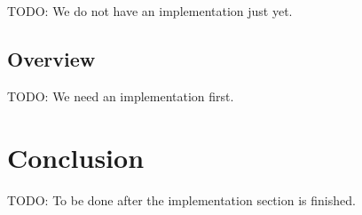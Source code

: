 \documentclass[conference, 11pt]{sty/IEEEtran}
\begin{document}
TODO: We do not have an implementation just yet.

\subsection{Overview}
\label{ssec:overview}

TODO: We need an implementation first.

\section{Conclusion}
\label{sec:conclusion}

TODO: To be done after the implementation section is finished.



\end{document}
